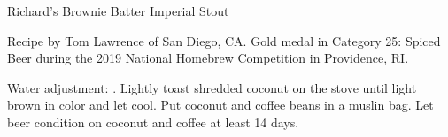 \begin{recipe}{Richard's Brownie Batter Imperial Stout} %

\begin{aboutblock}
Recipe by Tom Lawrence of San Diego, CA. Gold medal in Category 25: Spiced
Beer during the 2019 National Homebrew Competition in Providence, RI. \sourceaha
\end{aboutblock}


\begin{methodandtiming}
 
\begin{mashsteps}
\end{mashsteps}

\begin{fermentationsteps}
\end{fermentationsteps}

\begin{directions}
Water adjustment: . Lightly toast shredded
coconut on the stove until light brown in color and let cool. Put coconut and
coffee beans in a muslin bag. Let beer condition on coconut and coffee at least
14 days.
\end{directions}

\end{methodandtiming}

\recipebreak

\begin{ingredientsblock}

\begin{malts}
\end{malts}

\begin{hops}
\end{hops}


\begin{twists}
\end{twists}

\end{ingredientsblock}

\end{recipe}

